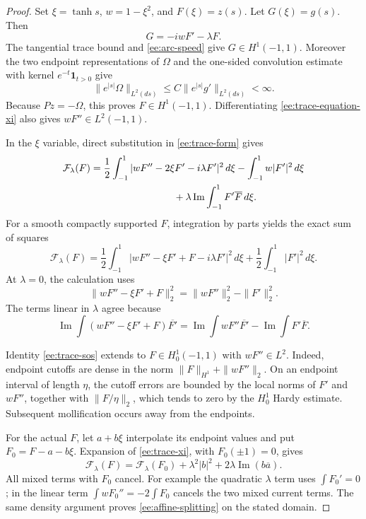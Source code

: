 \documentclass[reqno,11pt]{amsart}
\numberwithin{equation}{section}
\theoremstyle{remark}
\begin{document}
\begin{proof}
Set $\xi=\tanh s$, $w=1-\xi^2$, and $F(\xi)=z(s)$.
Let $G(\xi)=g(s)$. Then
\begin{equation}\label{ee:trace-equation-xi}
 G=-iwF'-\lambda F.
\end{equation}
The tangential trace bound and
\eqref{ee:arc-speed} give $G\in H^1(-1,1)$.
Moreover the two endpoint representations of $\Omega$ and the
one-sided convolution estimate with kernel $e^{-t}\mathbf1_{t>0}$
give
\[
 \|e^{|s|}\Omega\|_{L^2(ds)}
       \le C\|e^{|s|}g'\|_{L^2(ds)}<\infty.
\]
Because $Pz=-\Omega$, this proves $F\in H^1(-1,1)$.
Differentiating \eqref{ee:trace-equation-xi} also gives
$wF''\in L^2(-1,1)$.

In the $\xi$ variable, direct substitution in
\eqref{ee:trace-form} gives
\begin{align}\label{ee:trace-xi}
 \mathcal F_\lambda(F)
 ={}&\frac12\int_{-1}^1
       |wF''-2\xi F'-i\lambda F'|^2\,d\xi
     -\int_{-1}^1 w|F'|^2\,d\xi\notag\\
 &\hspace{25mm}+\lambda\operatorname{Im}
                         \int_{-1}^1F'\overline F\,d\xi.
\end{align}
For a smooth compactly supported $F$, integration by parts yields
the exact sum of squares
\begin{equation}\label{ee:trace-sos}
 \mathcal F_\lambda(F)
   =\frac12\int_{-1}^1
           |wF''-\xi F'+F-i\lambda F'|^2\,d\xi
     +\frac12\int_{-1}^1|F'|^2\,d\xi.
\end{equation}
At $\lambda=0$, the calculation uses
\[
 \|wF''-\xi F'+F\|_2^2
       =\|wF''\|_2^2-\|F'\|_2^2.
\]
The terms linear in $\lambda$ agree because
\[
 \operatorname{Im}\int
        (wF''-\xi F'+F)\overline{F'}
 =\operatorname{Im}\int wF''\overline{F'}
       -\operatorname{Im}\int F'\overline F.
\]

Identity \eqref{ee:trace-sos} extends to
$F\in H^1_0(-1,1)$ with $wF''\in L^2$. Indeed, endpoint cutoffs
are dense in the norm
$\|F\|_{H^1}+\|wF''\|_2$. On an endpoint interval of length
$\eta$, the cutoff errors are bounded by the local norms of
$F'$ and $wF''$, together with $\|F/\eta\|_2$, which tends to
zero by the $H^1_0$ Hardy estimate. Subsequent mollification occurs
away from the endpoints.

For the actual $F$, let $a+b\xi$ interpolate its endpoint values
and put $F_0=F-a-b\xi$. Expansion of
\eqref{ee:trace-xi}, with $F_0(\pm1)=0$, gives
\begin{equation}\label{ee:affine-splitting}
 \mathcal F_\lambda(F)
   =\mathcal F_\lambda(F_0)
           +\lambda^2|b|^2+2\lambda\operatorname{Im}(b\overline a).
\end{equation}
All mixed terms with $F_0$ cancel. For example the quadratic
$\lambda$ term uses $\int F_0'=0$; in the linear term
$\int wF_0''=-2\int F_0$ cancels the two mixed current terms.
The same density argument proves \eqref{ee:affine-splitting} on
the stated domain.


\end{proof}
\end{document}
